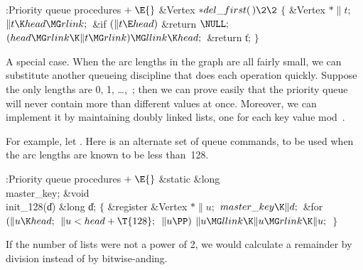 \B{}:Priority queue procedures\X${}\mathrel+\E{}$\6
\1\1\&{Vertex} ${}{*}\\{del\_first}(\,)\2\2{}$\6
${}\{{}$\5
\1\&{Vertex} ${}{*}\|t;{}$\7
${}\|t\K\\{head}\MG\\{rlink};{}$\6
\&{if} ${}(\|t\E\\{head}){}$\1\5
\&{return} ${}\NULL;{}$\2\6
${}(\\{head}\MG\\{rlink}\K\|t\MG\\{rlink})\MG\\{llink}\K\\{head};{}$\6
\&{return} \|t;\6
\4${}\}{}$\2\par
\fi

A special case. When the arc lengths in the graph are all fairly
small,
we can substitute another queueing discipline that does each operation
quickly. Suppose the only lengths are 0, 1, \dots,~; then we
can
prove easily that the priority queue will never contain more than 
different values at once. Moreover, we can implement it by maintaining
 doubly linked lists, one for each key value mod~.

For example, let .  Here is an alternate set of queue
commands,
to be used when the arc lengths are known to be less than~128.

\fi

\B{}:Priority queue procedures\X${}\mathrel+\E{}$\6
\&{static} \&{long} \\{master\_key};\7
\1\1\&{void} \\{init\_128}(\|d)\6
\&{long} \|d;\2\2\6
${}\{{}$\5
\1\&{register} \&{Vertex} ${}{*}\|u;{}$\7
${}\\{master\_key}\K\|d;{}$\6
\&{for} ${}(\|u\K\\{head};{}$ ${}\|u<\\{head}+\T{128};{}$ ${}\|u\PP){}$\1\5
${}\|u\MG\\{llink}\K\|u\MG\\{rlink}\K\|u;{}$\2\6
\4${}\}{}$\2\par
\fi

If the number of lists were not a power of 2, we would calculate a
remainder
by division instead of by bitwise-anding.

